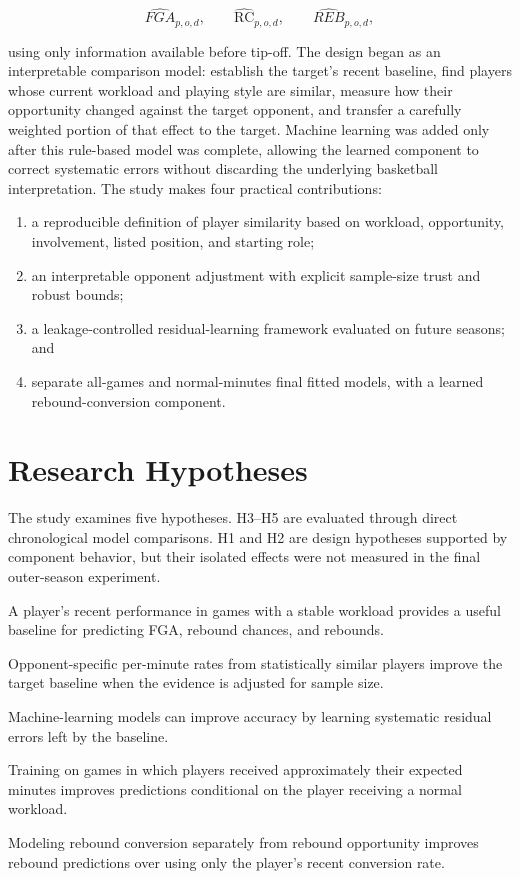 \documentclass[11pt]{article}
\newcommand{\RC}{\mathrm{RC}}
\begin{document}
\[
\widehat{FGA}_{p,o,d}, \qquad
\widehat{\RC}_{p,o,d}, \qquad
\widehat{REB}_{p,o,d},
\]

using only information available before tip-off. The design began as an
interpretable comparison model: establish the target's recent baseline, find
players whose current workload and playing style are similar, measure how
their opportunity changed against the target opponent, and transfer a
carefully weighted portion of that effect to the target. Machine learning was
added only after this rule-based model was complete, allowing the learned
component to correct systematic errors without discarding the underlying
basketball interpretation.
\newpage
The study makes four practical contributions:

\begin{enumerate}
    \item a reproducible definition of player similarity based on workload,
    opportunity, involvement, listed position, and starting role;
    \item an interpretable opponent adjustment with explicit sample-size trust
    and robust bounds;
    \item a leakage-controlled residual-learning framework evaluated on future
    seasons; and
    \item separate all-games and normal-minutes final fitted models, with a
    learned rebound-conversion component.
\end{enumerate}

\section{Research Hypotheses}

The study examines five hypotheses. H3--H5 are evaluated through direct
chronological model comparisons. H1 and H2 are design hypotheses supported by
component behavior, but their isolated effects were not measured in the final
outer-season experiment.

\begin{description}[style=nextline,leftmargin=0pt]
    \item[H1.] A player's recent performance in games with a stable workload
    provides a useful baseline for predicting FGA, rebound chances, and
    rebounds.
    \item[H2.] Opponent-specific per-minute rates from statistically similar
    players improve the target baseline when the evidence is adjusted for
    sample size.
    \item[H3.] Machine-learning models can improve accuracy by learning
    systematic residual errors left by the baseline.
    \item[H4.] Training on games in which players received approximately their
    expected minutes improves predictions conditional on the player receiving
    a normal workload.
    \item[H5.] Modeling rebound conversion separately from rebound opportunity
    improves rebound predictions over using only the player's recent
    conversion rate.
\end{description}
\end{document}
